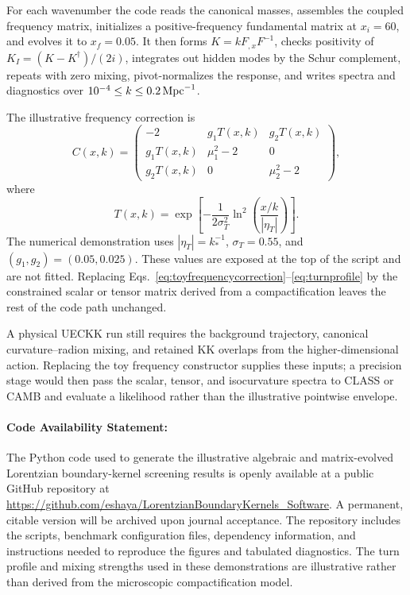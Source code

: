 \documentclass[11pt,a4paper]{article}
\begin{document}
For each wavenumber the code reads the canonical masses, assembles the coupled frequency matrix, initializes a positive-frequency fundamental matrix at $x_i=60$, and evolves it to $x_f=0.05$. It then forms $K=kF_{,x}F^{-1}$, checks positivity of $K_I=(K-K^\dagger)/(2i)$, integrates out hidden modes by the Schur complement, repeats with zero mixing, pivot-normalizes the response, and writes spectra and diagnostics over $10^{-4}\leq k\leq0.2\,{\rm Mpc}^{-1}$.

The illustrative frequency correction is
\begin{equation}
C(x,k)=
\begin{pmatrix}
-2 & g_1T(x,k) & g_2T(x,k)\\
g_1T(x,k) & \mu_1^2-2 & 0\\
g_2T(x,k) & 0 & \mu_2^2-2
\end{pmatrix},
\label{eq:toyfrequencycorrection}
\end{equation}
where
\begin{equation}
T(x,k)=\exp\left[-\frac{1}{2\sigma_T^2}
\ln^2\left(\frac{x/k}{|\eta_T|}\right)\right].
\label{eq:turnprofile}
\end{equation}
The numerical demonstration uses $|\eta_T|=k_*^{-1}$, $\sigma_T=0.55$, and $(g_1,g_2)=(0.05,0.025)$.  These values are exposed at the top of the script and are not fitted.  Replacing Eqs.~\eqref{eq:toyfrequencycorrection}--\eqref{eq:turnprofile} by the constrained scalar or tensor matrix derived from a compactification leaves the rest of the code path unchanged.

A physical UECKK run still requires the background trajectory, canonical curvature--radion mixing, and retained KK overlaps from the higher-dimensional action. Replacing the toy frequency constructor supplies these inputs; a precision stage would then pass the scalar, tensor, and isocurvature spectra to CLASS or CAMB and evaluate a likelihood rather than the illustrative pointwise envelope.

\paragraph{Code Availability Statement:}

The Python code used to generate the illustrative algebraic and matrix-evolved Lorentzian boundary-kernel screening results is openly available at a public GitHub repository at \url{https://github.com/eshaya/LorentzianBoundaryKernels_Software}. A permanent, citable version will be archived upon journal acceptance.
The repository includes the scripts, benchmark configuration files, dependency information, and instructions needed to reproduce the figures and tabulated diagnostics. The turn profile and mixing strengths used in these demonstrations are illustrative rather than derived from the microscopic compactification model.




\end{document}
